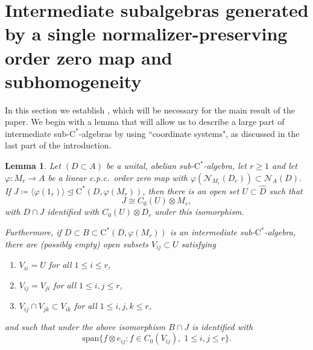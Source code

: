 \documentclass[11pt,a4paper]{amsart}
\newtheorem{lemma}[theorem]{Lemma}
\theoremstyle{definition}
\numberwithin{equation}{section}
\newcommand{\mc}[1]{\mathcal{#1}}
\begin{document}
\section{Intermediate subalgebras generated by a single normalizer-preserving order zero map and subhomogeneity}

\noindent In this section we establish , which will be necessary for the main result of the paper. We begin with a lemma that will allow us to describe a large part of intermediate sub-$\mathrm{C}^\ast$-algebras by using ``coordinate systems", as discussed in the last part of the introduction.

\begin{lemma}\label{lem:ideal-matrix-subhom}
Let $(D\subset A)$ be a unital, abelian sub-$\mathrm{C}^\ast$-algebra, let $r\ge1$ and let $\varphi\colon M_r\to A$ be a linear c.p.c.\ order zero map with $\varphi(\mc{N}_{M_r}(D_r))\subset\mc{N}_A(D)$. If $J\coloneqq\langle\varphi(1_r)\rangle\trianglelefteq\mathrm{C}^\ast(D,\varphi(M_r))$, then there is an open set $U\subset\widehat{D}$ such that
\begin{equation}
J\cong C_0(U)\otimes M_r,
\end{equation}
with $D\cap J$ identified with $C_0(U)\otimes D_r$ under this isomorphism. 

Furthermore, if $D\subset B\subset \mathrm{C}^\ast(D,\varphi(M_r))$ is an intermediate sub-$\mathrm{C}^\ast$-algebra, there are (possibly empty) open subsets $V_{ij}\subset U$ satisfying
\begin{enumerate}[label=\normalfont{(\roman*)}]
\item $V_{ii}=U$ for all $1\le i\le r$,
\item $V_{ij}=V_{ji}$ for all $1\le i,j\le r$,
\item $V_{ij}\cap V_{jk}\subset V_{ik}$ for all $1\le i,j,k\le r$,
\end{enumerate}
and such that under the above isomorphism $B\cap J$ is identified with
\begin{equation}
\mathrm{span}\{f\otimes e_{ij}: f\in C_0(V_{ij}),\; 1\le i,j\le r\}.
\end{equation}
\end{lemma}
\end{document}
